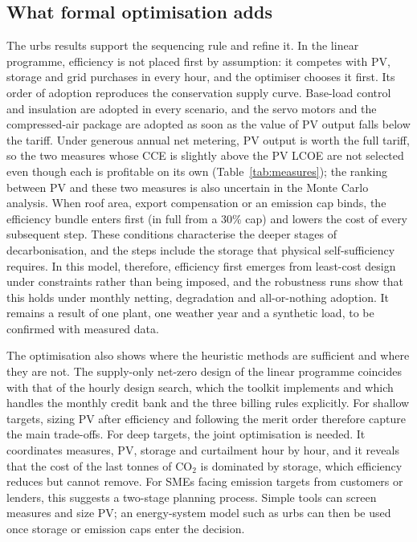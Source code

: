 \documentclass[processes,article,submit,pdftex,moreauthors]{Definitions/mdpi}
\begin{document}
\subsection{What formal optimisation adds}
The urbs results support the sequencing rule and refine it. In the linear programme, efficiency is not placed first by assumption: it competes with PV, storage and grid purchases in every hour, and the optimiser chooses it first. Its order of adoption reproduces the conservation supply curve. Base-load control and insulation are adopted in every scenario, and the servo motors and the compressed-air package are adopted as soon as the value of PV output falls below the tariff. Under generous annual net metering, PV output is worth the full tariff, so the two measures whose CCE is slightly above the PV LCOE are not selected even though each is profitable on its own (Table~\ref{tab:measures}); the ranking between PV and these two measures is also uncertain in the Monte Carlo analysis. When roof area, export compensation or an emission cap binds, the efficiency bundle enters first (in full from a 30\% cap) and lowers the cost of every subsequent step. These conditions characterise the deeper stages of decarbonisation, and the steps include the storage that physical self-sufficiency requires. In this model, therefore, efficiency first emerges from least-cost design under constraints rather than being imposed, and the robustness runs show that this holds under monthly netting, degradation and all-or-nothing adoption. It remains a result of one plant, one weather year and a synthetic load, to be confirmed with measured data.

The optimisation also shows where the heuristic methods are sufficient and where they are not. The supply-only net-zero design of the linear programme coincides with that of the hourly design search, which the toolkit implements and which handles the monthly credit bank and the three billing rules explicitly. For shallow targets, sizing PV after efficiency and following the merit order therefore capture the main trade-offs. For deep targets, the joint optimisation is needed. It coordinates measures, PV, storage and curtailment hour by hour, and it reveals that the cost of the last tonnes of CO$_2$ is dominated by storage, which efficiency reduces but cannot remove. For SMEs facing emission targets from customers or lenders, this suggests a two-stage planning process. Simple tools can screen measures and size PV; an energy-system model such as urbs can then be used once storage or emission caps enter the decision.
\end{document}
